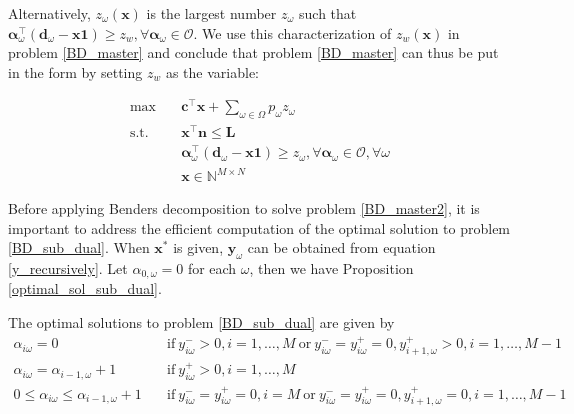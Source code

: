 Alternatively, $z_{\omega}(\mathbf{x})$ is the largest number $z_{\omega}$ such that $\bm{\alpha}_{\omega}^{\intercal}(\mathbf{d}_{\omega}- \mathbf{x} \mathbf{1}) \geq z_w, \forall \bm{\alpha}_{\omega} \in \mathcal{O}$. We use this characterization of $z_w(\mathbf{x})$ in problem \eqref{BD_master} and conclude that problem \eqref{BD_master} can thus be put in the form by setting $z_w$ as the variable:

\begin{equation}\label{BD_master2}
  \begin{aligned}
    \max \quad & \mathbf{c}^{\intercal} \mathbf{x} + \sum_{\omega \in \Omega} p_{\omega} z_{\omega} \\
    \text {s.t.} \quad & \mathbf{x}^{\intercal} \mathbf{n}  \leq \mathbf{L} \\
    & \bm{\alpha}_{\omega}^{\intercal}(\mathbf{d}_{\omega}- \mathbf{x} \mathbf{1}) \geq z_{\omega}, \forall \bm{\alpha}_{\omega} \in \mathcal{O}, \forall \omega \\
     & \mathbf{x} \in \mathbb{N}^{M \times N}
  \end{aligned}
\end{equation}


Before applying Benders decomposition to solve problem \eqref{BD_master2}, it is important to address the efficient computation of the optimal solution to problem \eqref{BD_sub_dual}. When $\mathbf{x}^{*}$ is given, $\mathbf{y}_{\omega}$ can be obtained from equation \eqref{y_recursively}. Let $\alpha_{0, \omega} = 0$ for each $\omega$, then we have Proposition \ref{optimal_sol_sub_dual}.

\begin{prop}\label{optimal_sol_sub_dual}
  The optimal solutions to problem \eqref{BD_sub_dual} are given by 
\begin{equation}\label{BD_sub_simplified}
  \begin{aligned}
    \alpha_{i \omega} = 0 \quad & \text{if}~  y_{i \omega}^{-} > 0,  i =1,\ldots, M~\text{or}~ y_{i \omega}^{-} = y_{i \omega}^{+} = 0, y_{i+1, \omega}^{+}> 0, i = 1,\ldots, M-1 \\
    \alpha_{i \omega} = \alpha_{i-1, \omega}+1 \quad & \text{if}~ y_{i \omega}^{+} > 0, i =1,\ldots, M \\
    0 \leq \alpha_{i \omega} \leq \alpha_{i-1, \omega}+1 \quad & \text{if}~ y_{i \omega}^{-} = y_{i \omega}^{+} = 0, i = M~\text{or}~ y_{i \omega}^{-} = y_{i \omega}^{+} = 0, y_{i+1, \omega}^{+}= 0, i = 1,\ldots, M-1
  \end{aligned}
\end{equation}
\end{prop}

